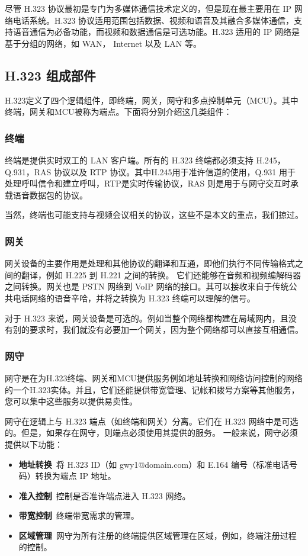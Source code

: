 \documentclass[lang=cn]{elegantpaper}
\begin{document}
尽管 H.323 协议最初是专门为多媒体通信技术定义的，但是现在最主要用在 IP 网络电话系统。H.323 协议适用范围包括数据、视频和语音及其融合多媒体通信，支持语音通信为必备功能，而视频和数据通信是可选功能。H.323 适用的 IP 网络是基于分组的网络，如 WAN， Internet 以及 LAN 等。

\subsection{H.323 组成部件}

H.323定义了四个逻辑组件，即终端，网关，网守和多点控制单元（MCU）。其中终端，网关和MCU被称为端点。下面将分别介绍这几类组件：

\subsubsection{终端}
终端是提供实时双工的 LAN 客户端。所有的 H.323 终端都必须支持 H.245，Q.931，RAS 协议以及 RTP 协议。其中H.245用于准许信道的使用，Q.931 用于处理呼叫信令和建立呼叫，RTP是实时传输协议，RAS 则是用于与网守交互时承载语音数据包的协议。

当然，终端也可能支持与视频会议相关的协议，这些不是本文的重点，我们掠过。

\subsubsection{网关}
网关设备的主要作用是处理和其他协议的翻译和互通，即他们执行不同传输格式之间的翻译，例如 H.225 到 H.221 之间的转换。 它们还能够在音频和视频编解码器之间转换。网关也是 PSTN 网络到 VoIP 网络的接口。其可以接收来自于传统公共电话网络的语音辛哈，并将之转换为 H.323 终端可以理解的信号。

对于 H.323 来说，网关设备是可选的。例如当整个网络都构建在局域网内，且没有别的要求时，我们就没有必要加一个网关，因为整个网络都可以直接互相通信。

\subsubsection{网守}

网守是在为H.323终端、网关和MCU提供服务例如地址转换和网络访问控制的网络的一个H.323实体。并且，它们还能提供带宽管理、记帐和拨号方案等其他服务，您可以集中这些服务以提供易卖性。

网守在逻辑上与 H.323 端点（如终端和网关）分离。它们在 H.323 网络中是可选的。但是，如果存在网守，则端点必须使用其提供的服务。
一般来说，网守必须提供以下功能：
\begin{itemize}
    \item \textbf{地址转换}\ 将 H.323 ID（如 gwy1@domain.com）和 E.164 编号（标准电话号码）转换为端点 IP 地址。
    \item \textbf{准入控制}\ 控制是否准许端点进入 H.323 网络。
    \item \textbf{带宽控制}\ 终端带宽需求的管理。
    \item \textbf{区域管理}\ 网守为所有注册的终端提供区域管理在区域，例如，终端注册过程的控制。
\end{itemize}
\end{document}
